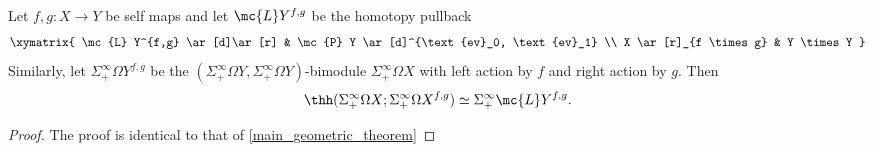 \documentclass[11pt]{amsart}
\begin{document}
\begin{cor}
  Let $f, g\colon  X \to Y$ be self maps and let $\mc{L} Y^{f,g}$ be the homotopy pullback
  \[
  \xymatrix{
    \mc{L} Y^{f,g} \ar[d]\ar[r] & \mc{P} Y \ar[d]^{\text{ev}_0, \text{ev}_1} \\
    X \ar[r]_{f \times g} & Y \times Y
  }
  \]
  Similarly, let $\Sigma^\infty_+ \Omega Y^{f,g}$ be the $(\Sigma^\infty_+ \Omega Y, \Sigma^\infty_+ \Omega Y)$-bimodule $\Sigma^\infty_+ \Omega X$ with left action by $f$ and right action by $g$. Then
  \[
  \thh(\Sigma^\infty_+ \Omega X; \Sigma^\infty_+ \Omega X^{f,g}) \simeq \Sigma^\infty_+ \mc{L} Y^{f,g}.
  \]
\end{cor}
\begin{proof}
The proof is identical to that of \cref{main_geometric_theorem}
\end{proof}




\end{document}

